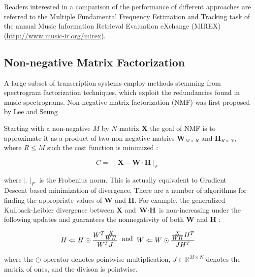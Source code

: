 Readers interested in a comparison of the performance of different approaches
are referred to the Multiple Fundamental Frequency Estimation and Tracking task
of the annual Music Information Retrieval Evaluation eXchange (MIREX)
(\url{http://www.music-ir.org/mirex}).


\subsection{Non-negative Matrix Factorization}

A large subset of transcription systems employ methods stemming from spectrogram
factorization techniques, which exploit the redundancies found in music
spectrograms. Non-negative matrix factorization (NMF) was first proposed by Lee
and Seung \cite{nmf1999:Seung}


Starting with a non-negative $M$ by $N$ matrix \textbf{X} the goal of NMF is to
approximate it as a product of two non-negative matrics $ \textbf{W}_{M \times
    R}$ and $\textbf{H}_{R \times N}$, where $R \leq M$ such the cost function is
minimized :

\begin{equation}
  C = \;\mid \textbf{X} - \textbf{W}\cdot \textbf{H} \mid _ {F}
\end{equation}

where $\mid . \mid_{F}$ is the Frobenius norm. This is actually equivalent to
Gradient Descent based minimization of divergence. \cite{nmfamt2003:Smaragdis}
There are a number of algorithms for finding the appropriate values of
\textbf{W} and \textbf{H}. For example, the generalized Kullback-Leibler
divergence between \textbf{X} and $\textbf{W}\cdot \textbf{H}$ is non-increasing
under the following updates and guarantees the nonnegativity of both \textbf{W}
and \textbf{H} :

\begin{equation}
  \begin{split}
    H \Leftarrow H \odot \frac{W^{T}\frac{X}{WH}}{W^{T}J}
  \end{split}
  \text{\;\;and\;\;}
  \begin{split}
    W \Leftarrow W \odot \frac{\frac{X}{WH}H^{T}}{JH^{T}}
  \end{split}
  \label{review:eq:gradient_rules}
\end{equation}

where the $\odot$ operator denotes pointwise multiplication, $J \in
  \mathbb{R}^{M \times N}$ denotes the matrix of ones, and the divison is
pointwise. \cite{amt2019:Benetos}

